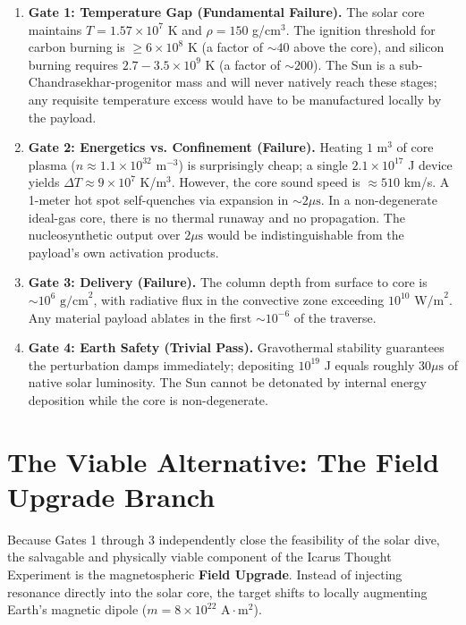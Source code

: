 \begin{enumerate}
    \item \textbf{Gate 1: Temperature Gap (Fundamental Failure).} The solar core maintains $T = 1.57 \times 10^7$ K and $\rho = 150$ g/cm$^3$. The ignition threshold for carbon burning is $\ge 6 \times 10^8$ K (a factor of $\sim 40$ above the core), and silicon burning requires $2.7 - 3.5 \times 10^9$ K (a factor of $\sim 200$). The Sun is a sub-Chandrasekhar-progenitor mass and will never natively reach these stages; any requisite temperature excess would have to be manufactured locally by the payload.
    \item \textbf{Gate 2: Energetics vs. Confinement (Failure).} Heating $1 \text{ m}^3$ of core plasma ($n \approx 1.1 \times 10^{32} \text{ m}^{-3}$) is surprisingly cheap; a single $2.1 \times 10^{17}$ J device yields $\Delta T \approx 9 \times 10^7$ K/m$^3$. However, the core sound speed is $\approx 510$ km/s. A 1-meter hot spot self-quenches via expansion in $\sim 2 \mu\text{s}$. In a non-degenerate ideal-gas core, there is no thermal runaway and no propagation. The nucleosynthetic output over $2 \mu\text{s}$ would be indistinguishable from the payload's own activation products.
    \item \textbf{Gate 3: Delivery (Failure).} The column depth from surface to core is $\sim 10^6 \text{ g/cm}^2$, with radiative flux in the convective zone exceeding $10^{10} \text{ W/m}^2$. Any material payload ablates in the first $\sim 10^{-6}$ of the traverse.
    \item \textbf{Gate 4: Earth Safety (Trivial Pass).} Gravothermal stability guarantees the perturbation damps immediately; depositing $10^{19}$ J equals roughly $30 \mu\text{s}$ of native solar luminosity. The Sun cannot be detonated by internal energy deposition while the core is non-degenerate.
\end{enumerate}

\section[The Viable Alternative]{The Viable Alternative: The Field Upgrade Branch}
Because Gates 1 through 3 independently close the feasibility of the solar dive, the salvagable and physically viable component of the Icarus Thought Experiment is the magnetospheric \textbf{Field Upgrade}. Instead of injecting resonance directly into the solar core, the target shifts to locally augmenting Earth's magnetic dipole ($m = 8 \times 10^{22} \text{ A}\cdot\text{m}^2$).


